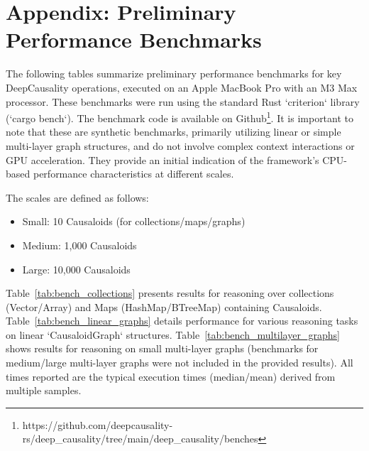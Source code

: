 \appendix
\section{Appendix: Preliminary Performance Benchmarks}
\label{app:benchmarks}

The following tables summarize preliminary performance benchmarks for key DeepCausality operations, executed on an Apple MacBook Pro with an M3 Max processor. These benchmarks were run using the standard Rust `criterion` library (`cargo bench`). The benchmark code is available on Github\footnote{https://github.com/deepcausality-rs/deep\_causality/tree/main/deep\_causality/benches}. It is important to note that these are synthetic benchmarks, primarily utilizing linear or simple multi-layer graph structures, and do not involve complex context interactions or GPU acceleration. They provide an initial indication of the framework's CPU-based performance characteristics at different scales.

The scales are defined as follows:
\begin{itemize}
    \item Small: 10 Causaloids (for collections/maps/graphs)
    \item Medium: 1,000 Causaloids
    \item Large: 10,000 Causaloids
\end{itemize}

Table~\ref{tab:bench_collections} presents results for reasoning over collections (Vector/Array) and Maps (HashMap/BTreeMap) containing Causaloids. Table~\ref{tab:bench_linear_graphs} details performance for various reasoning tasks on linear `CausaloidGraph` structures. Table~\ref{tab:bench_multilayer_graphs} shows results for reasoning on small multi-layer graphs (benchmarks for medium/large multi-layer graphs were not included in the provided results). All times reported are the typical execution times (median/mean) derived from multiple samples.

